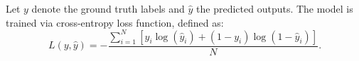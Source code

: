 \documentclass[preprint,12pt]{elsarticle}
\theoremstyle{plain}
\theoremstyle{definition}
\theoremstyle{remark}
\begin{document}




Let $y$ denote the ground truth labels and $\hat{y}$ the predicted outputs. The model is trained via cross-entropy loss function, defined as:
\begin{equation}
L(y, \hat{y}) = -\frac{\sum_{i=1}^{N} \left[ y_i \log(\hat{y}_i) + (1 - y_i) \log(1 - \hat{y}_i) \right]}{N}.
\end{equation}
\end{document}
